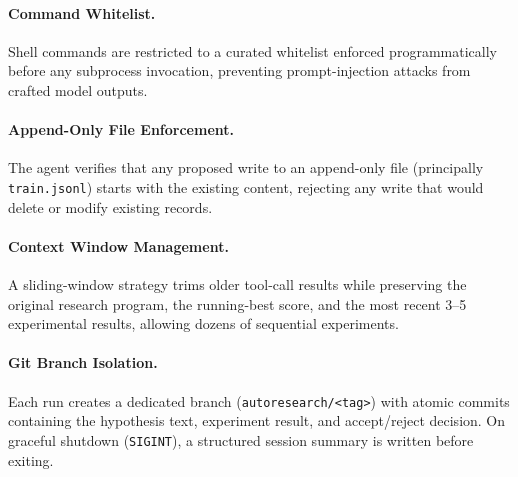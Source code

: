 \documentclass[11pt]{article}
\begin{document}
\paragraph{Command Whitelist.}
Shell commands are restricted to a curated whitelist enforced
programmatically before any subprocess invocation, preventing
prompt-injection attacks from crafted model outputs.

\paragraph{Append-Only File Enforcement.}
The agent verifies that any proposed write to an append-only file
(principally \texttt{train.jsonl}) starts with the existing content,
rejecting any write that would delete or modify existing records.

\paragraph{Context Window Management.}
A sliding-window strategy trims older tool-call results while preserving
the original research program, the running-best score, and the most
recent 3--5 experimental results, allowing dozens of sequential experiments.

\paragraph{Git Branch Isolation.}
Each run creates a dedicated branch (\texttt{autoresearch/<tag>}) with
atomic commits containing the hypothesis text, experiment result, and
accept/reject decision. On graceful shutdown (\texttt{SIGINT}), a
structured session summary is written before exiting.
\end{document}
